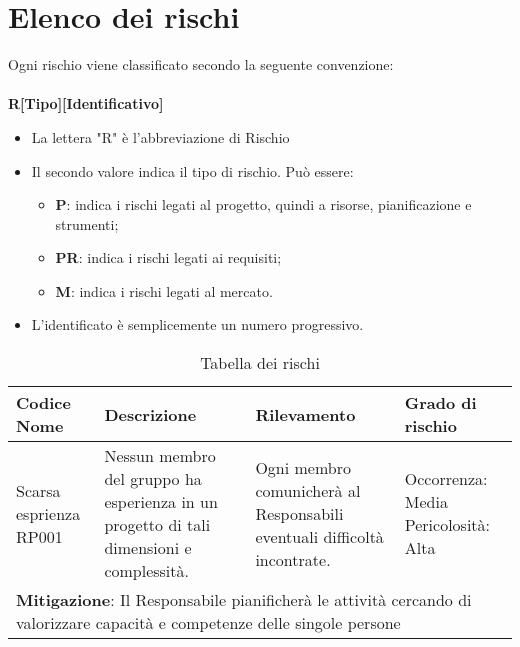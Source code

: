 \section{Elenco dei rischi}
Ogni rischio viene classificato secondo la seguente convenzione:\\\\
\centering \textbf{R[Tipo][Identificativo]}\\
\begin{itemize}
	\item La lettera "R" è l'abbreviazione di Rischio
	\item Il secondo valore indica il tipo di rischio. Può essere:
		\begin{itemize}
			\item \textbf{P}: indica i rischi legati al progetto, quindi a risorse, pianificazione e strumenti;
			\item \textbf{PR}: indica i rischi legati ai requisiti;
			\item \textbf{M}: indica i rischi legati al mercato.
		\end{itemize}
	\item L'identificato è semplicemente un numero progressivo.
\end{itemize}
\begin{table}[tbph]
	\caption{Tabella dei rischi}
	\begin{tabularx}{\textwidth}{|X|X|X|X|}
		\hline
		\textbf{Codice Nome} & \textbf{Descrizione} & 	\textbf{Rilevamento} & \textbf{Grado di rischio}\\
		\hline
		Scarsa esprienza RP001 & Nessun membro del gruppo ha esperienza in un progetto di tali dimensioni e complessità. &
		Ogni membro comunicherà al Responsabili eventuali difficoltà incontrate. & Occorrenza: Media Pericolosità: Alta \\
		\hline
		\multicolumn{4}{X}{\textbf{Mitigazione}: Il Responsabile pianificherà le attività cercando di valorizzare capacità e competenze delle singole persone}\\


	\end{tabularx}
\end{table}
